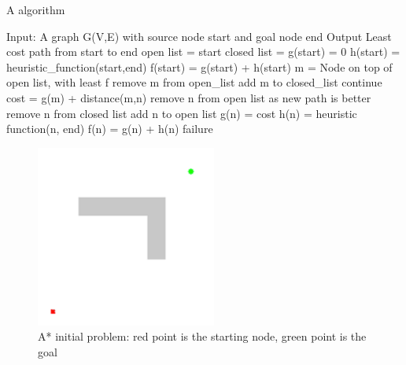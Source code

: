 \begin{algorithm}
\caption{A algorithm}\label{alg:a_star}
\begin{algorithmic}
\STATE Input: A graph G(V,E) with source node start and goal node end
\STATE Output Least cost path from start to end
\STATE open list = {start}
\STATE closed list = {}
\STATE g(start) = 0
\STATE h(start) = heuristic_function(start,end)
\STATE f(start) = g(start) + h(start)
    \STATE m = Node on top of open list, with least f
        \RETURN
    \ENDIF
    \STATE remove m from open_list
    \STATE add m to closed_list
    \STATE continue
    \ENDIF
    \STATE cost = g(m) + distance(m,n)
    \STATE remove n from open list as new path is better
    \ENDIF
    \STATE remove n from closed list
    \ENDIF
    \STATE add n to open list
    \STATE g(n) = cost
    \STATE h(n) = heuristic function(n, end)
    \STATE f(n) = g(n) + h(n)
    \ENDIF
    \ENDFOR
    \ENDWHILE
\RETURN failure
\end{algorithmic}
\end{algorithm}

\begin{figure}[H]
    \centering
    \includegraphics[scale=0.5]{Images/Chapter 4/Aproblem.png}
    \caption{A* initial problem: red point is the starting node, green point is the goal}
    \label{fig:aproblem}
\end{figure}

